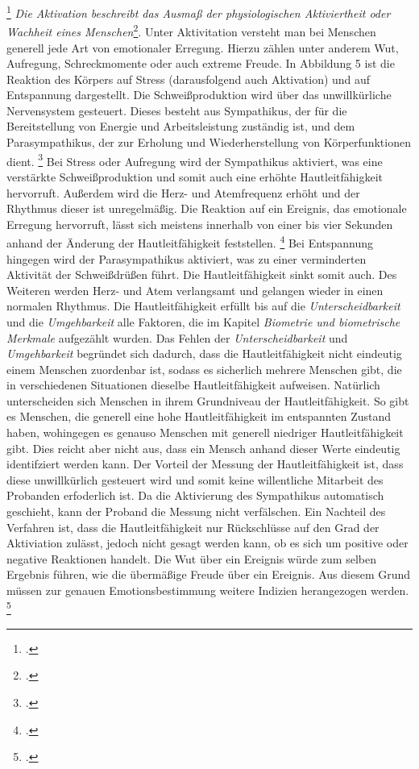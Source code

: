 \footcitetext[][S. 200]{Dil13}
\newline
\glqq \textit{Die Aktivation beschreibt das Ausmaß der physiologischen Aktiviertheit oder Wachheit eines Menschen}\grqq{}\footcite[][S. 28]{Die06}. Unter Aktivitation versteht man bei Menschen generell jede Art von emotionaler Erregung. Hierzu zählen unter anderem Wut, Aufregung, Schreckmomente oder auch extreme Freude. In Abbildung 5 ist die Reaktion des Körpers auf Stress (darausfolgend auch Aktivation) und auf Entspannung dargestellt. Die Schweißproduktion wird über das unwillkürliche Nervensystem gesteuert. Dieses besteht aus Sympathikus, der für die Bereitstellung von Energie und Arbeitsleistung zuständig ist, und dem Parasympathikus, der zur Erholung und Wiederherstellung von Körperfunktionen dient. \footcite[Vgl. ][S. 5]{Lie13} \newline Bei Stress oder Aufregung wird der Sympathikus aktiviert, was eine verstärkte Schweißproduktion und somit auch eine erhöhte Hautleitfähigkeit hervorruft. Außerdem wird die Herz- und Atemfrequenz erhöht und der Rhythmus dieser ist unregelmäßig. Die Reaktion auf ein Ereignis, das emotionale Erregung hervorruft, lässt sich meistens innerhalb von einer bis vier Sekunden anhand der Änderung der Hautleitfähigkeit feststellen. \footcite[Vgl.][S. 130f]{Sch14} \newline 
Bei Entspannung hingegen wird der Parasympathikus aktiviert, was zu einer verminderten Aktivität der Schweißdrüßen führt. Die Hautleitfähigkeit sinkt somit auch. Des Weiteren werden Herz- und Atem verlangsamt und gelangen wieder in einen normalen Rhythmus. \newline
Die Hautleitfähigkeit erfüllt bis auf die \textit{Unterscheidbarkeit} und die \textit{Umgehbarkeit} alle Faktoren, die im Kapitel \textit{Biometrie und biometrische Merkmale} aufgezählt wurden. Das Fehlen der \textit{Unterscheidbarkeit} und \textit{Umgehbarkeit} begründet sich dadurch, dass die Hautleitfähigkeit nicht eindeutig einem Menschen zuordenbar ist, sodass es sicherlich mehrere Menschen gibt, die in verschiedenen Situationen dieselbe Hautleitfähigkeit aufweisen. Natürlich unterscheiden sich Menschen in ihrem Grundniveau der Hautleitfähigkeit. So gibt es Menschen, die generell eine hohe Hautleitfähigkeit im entspannten Zustand haben, wohingegen es genauso Menschen mit generell niedriger Hautleitfähigkeit gibt. Dies reicht aber nicht aus, dass ein Mensch anhand dieser Werte eindeutig identifziert werden kann. \newline
Der Vorteil der Messung der Hautleitfähigkeit ist, dass diese unwillkürlich gesteuert wird und somit keine willentliche Mitarbeit des Probanden erfoderlich ist. Da die Aktivierung des Sympathikus automatisch geschieht, kann der Proband die Messung nicht verfälschen. \newline
Ein Nachteil des Verfahren ist, dass die Hautleitfähigkeit nur Rückschlüsse auf den Grad der Aktiviation zulässt, jedoch nicht gesagt werden kann, ob es sich um positive oder negative Reaktionen handelt. Die Wut über ein Ereignis würde zum selben Ergebnis führen, wie die übermäßige Freude über ein Ereignis. Aus diesem Grund müssen zur genauen Emotionsbestimmung weitere Indizien herangezogen werden. \footcite[Vgl. ][S.77]{Moe07}

